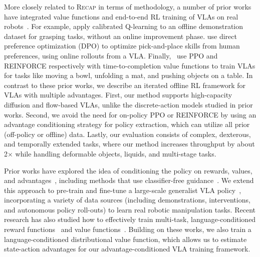 \documentclass[conference]{IEEEtran}
\def \MethodName {\textsc{Recap}}
\begin{document}
More closely related to \MethodName{} in terms of methodology, a number of prior works have integrated value functions and end-to-end RL training of VLAs on real robots~\citep{Huang2025CORFT,Zhang2024GRAPE,Zhai2025VLAC,Ghasemipour2025SelfImprovingEFM}. 
For example, \citet{Huang2025CORFT} apply calibrated Q-learning to an offline demonstration dataset for grasping tasks, without an online improvement phase.
\citet{Zhang2024GRAPE} use direct preference optimization (DPO) to optimize pick-and-place skills from human preferences, using online rollouts from a VLA. 
Finally,~\citet{Zhai2025VLAC,Ghasemipour2025SelfImprovingEFM} use PPO and REINFORCE respectively with time-to-completion value functions to train VLAs for tasks like moving a bowl, unfolding a mat, and pushing objects on a table.
In contrast to these prior works, we describe an iterated offline RL framework for VLAs with multiple advantages. First, our method supports high-capacity diffusion and flow-based VLAs, unlike the discrete-action models studied in prior works. Second, we avoid the need for on-policy PPO or REINFORCE by using an advantage conditioning strategy for policy extraction, which can utilize all prior (off-policy or offline) data. Lastly, our evaluation consists of complex, dexterous, and temporally extended tasks, where our method increases throughput by about 2$\times$ while handling deformable objects, liquids, and multi-stage tasks.


Prior works have explored the idea of conditioning the policy on rewards, values, and advantages~\cite{Schmidhuber2019UpsideDownRL,Kumar2019RewardConditionedPolicies,Chen2021DecisionTransformer,Brandfonbrener2022RCSL,Emmons2022RvS,Furuta2022GDT,Yamagata2023QDT,Zheng2022ODT,kuba2023advantage,Wu2023ElasticDecisionTransformer}, including methods that use classifier-free guidance~\cite{Frans2025DiffusionGuidance}. We extend this approach to pre-train and fine-tune a large-scale generalist VLA policy~\cite{black2025pi05}, incorporating a variety of data sources (including demonstrations, interventions, and autonomous policy roll-outs) to learn real robotic manipulation tasks.
Recent research has also studied how to effectively train multi-task, language-conditioned reward functions~\cite{Shao2020Concept2Robot,Chen2021DVD,Nair2022LanguageConditionedRobotBehavior,Sontakke2023RoboCLIP,Yu2023LanguageToRewards,Zhang2025ReWiND,Alakuijala2025VideoLanguageCritic} and value functions~\cite{Ma2023LIV,Ma2025GVL,Zhai2025VLAC}. Building on these works, we also train a language-conditioned distributional value function, which allows us to estimate state-action advantages for our advantage-conditioned VLA training framework.
\end{document}
